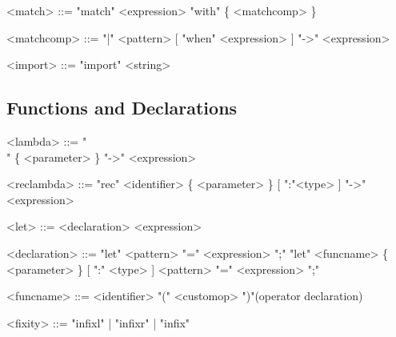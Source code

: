 \documentclass{article}
\begin{document}
\begin{grammar}
  <match> ::= "match" \textvisiblespace <expression> "with" \textvisiblespace  \{ <matchcomp>  \}

  <matchcomp> ::= "|" \textvisiblespace <pattern> [ "when" \textvisiblespace <expression> ] "->" \textvisiblespace <expression>
\end{grammar}

\begin{grammar}
  <import> ::= "import" \textvisiblespace <string>
\end{grammar}

\subsection{Functions and Declarations}

\begin{grammar}
  <lambda> ::= "\\" \textvisiblespace \{ <parameter> \} "->" \textvisiblespace <expression>
\end{grammar}

\begin{grammar}
  <reclambda> ::= "rec" \textvisiblespace <identifier> \textvisiblespace \{ <parameter> \} [ ":"\textvisiblespace <type> ] "->" \textvisiblespace <expression>
\end{grammar}

\begin{grammar}
  <let> ::= <declaration> \textvisiblespace <expression>
\end{grammar}

\begin{grammar}
  <declaration> ::= "let" \textvisiblespace <pattern> "=" \textvisiblespace <expression> ";" \textvisiblespace
  \alt "let"  <funcname> \{ <parameter> \} [ ":" \textvisiblespace <type> ] <pattern> "=" \textvisiblespace <expression> ";" \textvisiblespace

  <funcname> ::= <identifier> \textvisiblespace
    "(" \textvisiblespace <customop> \textvisiblespace ")"\textvisiblespace \hfill (operator declaration)

  <fixity> ::= "infixl" | "infixr" | "infix"
\end{grammar}
\end{document}
